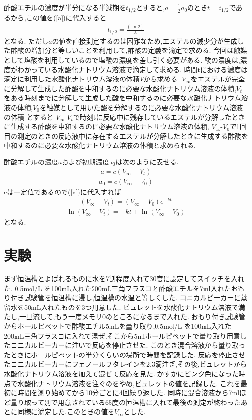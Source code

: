 \documentclass[a4j,10pt,dvipdfmx]{jarticle}
\begin{document}
酢酸エチルの濃度が半分になる半減期を$t_{1/2}$とすると,$a= \frac{1}{2}a_0$のとき$t=t_{1/2}$であるから,この値を(\ref{a})に代入すると
\begin{eqnarray}
  \label{t_1/2}
  t_{1/2} = \frac{(\ln2)}{k}
\end{eqnarray}
となる.
ただし$a$の値を直接測定するのは困難なため,エステルの減少分が生成した酢酸の増加分と等しいことを利用して,酢酸の定義を滴定で求める.
今回は触媒として塩酸を利用しているので塩酸の濃度を差し引く必要がある.
酸の濃度は,濃度がわかっている水酸化ナトリウム溶液で滴定して求める.
時間tにおける濃度は滴定に利用した水酸化ナトリウム溶液の体積$V$から求める.
$V_\infty$をエステルが完全に分解して生成した酢酸を中和するのに必要な水酸化ナトリウム溶液の体積,$V_t$をある時刻までに分解して生成した酸を中和するのに必要な水酸化ナトリウム溶液の体積,$V_0$を触媒として用いた酸を分解するのに必要な水酸化ナトリウム溶液の体積
とすると
$V_\infty$-$V_t$で時刻tに反応中に残存しているエステルが分解したときに生成する酢酸を中和するのに必要な水酸化ナトリウム溶液の体積,
$V_\infty$-$V_0$で1回目の測定のときの反応液中に存在するエステルが分解したときに生成する酢酸を中和するのに必要な水酸化ナトリウム溶液の体積と求められる.

酢酸エチルの濃度$a$および初期濃度$a_0$は次のように表せる.
\begin{eqnarray}
  \label{a11}
  a = c(V_\infty-V_t)
\end{eqnarray}
\begin{eqnarray}
  \label{a12}
  a_0 = c(V_\infty-V_0)
\end{eqnarray}
cは一定値であるので(\ref{a})に代入すれば
\begin{eqnarray}
  \label{ac1}
  (V_\infty-V_t) = (V_\infty-V_0)e^{-kt}
\end{eqnarray}
\begin{eqnarray}
  \label{ac2}
  \ln(V_\infty-V_t) = -kt + \ln(V_\infty-V_0)
\end{eqnarray}
となる.
\section{実験}
まず恒温槽とよばれるものに水を7割程度入れて30度に設定してスイッチを入れた.
0.5mol/L を100mL入れた200mL三角フラスコと酢酸エチルを7ml入れたおもり付き試験管を恒温槽に浸し,恒温槽の水温と等しくした.
コニカルビーカーに蒸留水を50mL入れたものを3つ用意した.
ビュレットを水酸化ナトリウム溶液で満たし,一旦流して,もう一度メモリ0のところになるまで入れた.
おもり付き試験管からホールピペットで酢酸エチル5mLを量り取り,0.5mol/L を100mL入れた200mL三角フラスコに入れて混ぜ,そこから5mlホールピペットで量り取り用意したコニカルビーカーに注いで反応を停止させた.
このとき混合溶液から量り取ったときにホールピペットの半分くらいの場所で時間を記録した.
反応を停止させたコニカルビーカーにフェノールフタレインを2,3滴注ぎ,その後,ビュレットから水酸化ナトリウム溶液を加えて混ぜて反応を見た.
かすかにピンク色になった時点で水酸化ナトリウム溶液を注ぐのをやめ,ビュレットの値を記録した.
これを最初に時間を測り始めてから10分ごとに4回繰り返した.
同時に混合溶液から7mlほど量り取って別で用意されている65度の恒温槽に入れて最後の測定が終わったあとに同様に滴定した.このときの値を$V_\infty$とした.
\end{document}
